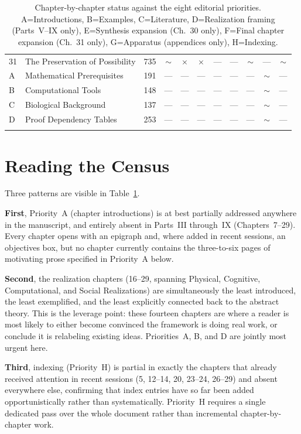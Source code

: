 \documentclass[11pt]{report}
\newcommand{\statusgap}{\textcolor{red!70!black}{$\times$}}
\newcommand{\statuspartial}{\textcolor{orange!80!black}{$\sim$}}
\begin{document}
\begin{longtable}{@{}p{0.5cm}p{4.3cm}p{1.3cm}cccccccc@{}}
31 & The Preservation of Possibility  & 735 & \statuspartial & \statusgap & \statusgap & --- & --- & \statuspartial & --- & \statuspartial \\
A  & Mathematical Prerequisites       & 191 & --- & --- & --- & --- & --- & --- & \statuspartial & --- \\
B  & Computational Tools              & 148 & --- & --- & --- & --- & --- & --- & \statuspartial & --- \\
C  & Biological Background            & 137 & --- & --- & --- & --- & --- & --- & \statuspartial & --- \\
D  & Proof Dependency Tables          & 253 & --- & --- & --- & --- & --- & --- & \statuspartial & --- \\
\bottomrule
\caption{Chapter-by-chapter status against the eight editorial
  priorities. A=Introductions, B=Examples, C=Literature,
  D=Realization framing (Parts~V--IX only), E=Synthesis
  expansion (Ch.~30 only), F=Final chapter expansion (Ch.~31
  only), G=Apparatus (appendices only), H=Indexing.}
\label{tab:chapter-census}
\end{longtable}

\section{Reading the Census}
\label{sec:assessment-patterns}

Three patterns are visible in Table~\ref{tab:chapter-census}.

\textbf{First}, Priority~A (chapter introductions) is at best
partially addressed anywhere in the manuscript, and entirely
absent in Parts~III through~IX (Chapters~7--29). Every chapter
opens with an epigraph and, where added in recent sessions, an
objectives box, but no chapter currently contains the
three-to-six pages of motivating prose specified in
Priority~A below.

\textbf{Second}, the realization chapters (16--29, spanning
Physical, Cognitive, Computational, and Social Realizations)
are simultaneously the least introduced, the least exemplified,
and the least explicitly connected back to the abstract theory.
This is the leverage point: these fourteen chapters are where a
reader is most likely to either become convinced the framework
is doing real work, or conclude it is relabeling existing
ideas. Priorities~A, B, and D are jointly most urgent here.

\textbf{Third}, indexing (Priority~H) is partial in exactly the
chapters that already received attention in recent sessions
(5, 12--14, 20, 23--24, 26--29) and absent everywhere else,
confirming that index entries have so far been added
opportunistically rather than systematically. Priority~H
requires a single dedicated pass over the whole document rather
than incremental chapter-by-chapter work.
\end{document}
